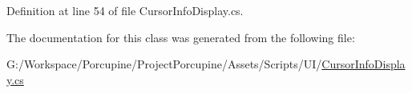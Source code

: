 Definition at line 54 of file Cursor\+Info\+Display.\+cs.



The documentation for this class was generated from the following file\+:\begin{DoxyCompactItemize}
\item 
G\+:/\+Workspace/\+Porcupine/\+Project\+Porcupine/\+Assets/\+Scripts/\+U\+I/\hyperlink{_cursor_info_display_8cs}{Cursor\+Info\+Display.\+cs}\end{DoxyCompactItemize}

